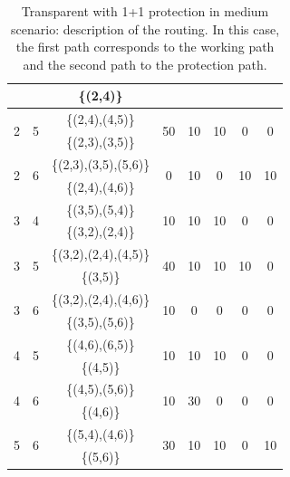 \begin{table}[h!]
\begin{tabular}{|| c | c | c | c | c | c | c | c ||}
 & & \{(2,4)\} & & & & & \\ \hline
 \multirow{2}{*}{2} & \multirow{2}{*}{5} & \{(2,4),(4,5)\} & \multirow{2}{*}{50} & \multirow{2}{*}{10} & \multirow{2}{*}{10} & \multirow{2}{*}{0} & \multirow{2}{*}{0}\\
 & & \{(2,3),(3,5)\} & & & & & \\ \hline
 \multirow{2}{*}{2} & \multirow{2}{*}{6} & \{(2,3),(3,5),(5,6)\} & \multirow{2}{*}{0} & \multirow{2}{*}{10} & \multirow{2}{*}{0} & \multirow{2}{*}{10} & \multirow{2}{*}{10}\\
 & & \{(2,4),(4,6)\} & & & & & \\ \hline
 \multirow{2}{*}{3} & \multirow{2}{*}{4} & \{(3,5),(5,4)\} & \multirow{2}{*}{10} & \multirow{2}{*}{10} & \multirow{2}{*}{10} & \multirow{2}{*}{0} & \multirow{2}{*}{0}\\
 & & \{(3,2),(2,4)\} & & & & & \\ \hline
 \multirow{2}{*}{3} & \multirow{2}{*}{5} & \{(3,2),(2,4),(4,5)\} & \multirow{2}{*}{40} & \multirow{2}{*}{10} & \multirow{2}{*}{10} & \multirow{2}{*}{10} & \multirow{2}{*}{0}\\
 & & \{(3,5)\} & & & & & \\ \hline
 \multirow{2}{*}{3} & \multirow{2}{*}{6} & \{(3,2),(2,4),(4,6)\} & \multirow{2}{*}{10} & \multirow{2}{*}{0} & \multirow{2}{*}{0} & \multirow{2}{*}{0} & \multirow{2}{*}{0}\\
 & & \{(3,5),(5,6)\} & & & & & \\ \hline
 \multirow{2}{*}{4} & \multirow{2}{*}{5} & \{(4,6),(6,5)\} & \multirow{2}{*}{10} & \multirow{2}{*}{10} & \multirow{2}{*}{10} & \multirow{2}{*}{0} & \multirow{2}{*}{0}\\
 & & \{(4,5)\} & & & & & \\ \hline
 \multirow{2}{*}{4} & \multirow{2}{*}{6} & \{(4,5),(5,6)\} & \multirow{2}{*}{10} & \multirow{2}{*}{30} & \multirow{2}{*}{0} & \multirow{2}{*}{0} & \multirow{2}{*}{0}\\
 & & \{(4,6)\} & & & & & \\ \hline
 \multirow{2}{*}{5} & \multirow{2}{*}{6} & \{(5,4),(4,6)\} & \multirow{2}{*}{30} & \multirow{2}{*}{10} & \multirow{2}{*}{10} & \multirow{2}{*}{0} & \multirow{2}{*}{10}\\
 & & \{(5,6)\} & & & & & \\
 \hline
\end{tabular}
\caption{Transparent with 1+1 protection in medium scenario: description of the routing. In this case, the first path corresponds to the working path and the second path to the protection path.}
\label{path_transp_protec_ref_medium}
\end{table}

